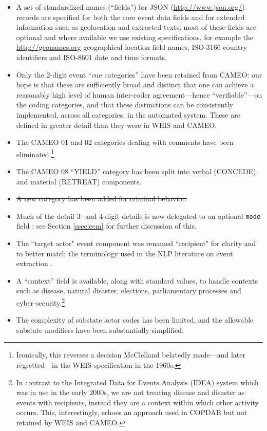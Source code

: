 \documentclass[11pt]{report}
\newcommand{\plcat}[1]{\textsf{#1}}
\newcommand{\fn}[1]{\footnote{#1}}
\begin{document}
\begin{itemize}
\item A set of standardized names (``fields'') for JSON (\url{http://www.json.org/}) records are specified for both the core event data fields and for extended information such as geolocation and extracted texts; most of these fields are optional and where available we use existing specifications, for example the \url{http://geonames.org} geographical location field names, ISO-3166 country identifiers and ISO-8601 date and time formats.
\item Only the 2-digit event ``cue categories'' have been retained from CAMEO: our hope is that these are sufficiently broad and distinct that one can achieve a reasonably high level of human inter-coder agreement---hence ``verifiable''---on the coding categories, and that these distinctions can be consistently implemented, across all categories, in the automated system. These are defined in greater detail than they were in WEIS and CAMEO.
\item The CAMEO 01 and 02 categories dealing with comments have been eliminated.\fn{Ironically, this reverses a decision McClelland belatedly made---and later regretted---in the WEIS specification in the 1960s.}
\item The CAMEO 08 ``YIELD'' category has been split into verbal (\plcat{CONCEDE}) and material (\plcat{RETREAT}) components. 
\item \sout{A new category has been added for criminal behavior.}
\item Much of the detail 3- and 4-digit details is now delegated to an optional \texttt{mode} field : see Section \ref{ssec:ecm} for further discussion of this.  
\item The ``target actor" event component was renamed ``recipient" for clarity and to better match the terminology used in the NLP literature on event extraction \citep{halterman2020extracting}.
\item A ``context'' field is available, along with standard values, to handle contexts such as disease, natural disaster, elections, parliamentary processes and cyber-security.\fn{In contrast to the Integrated Data for Events Analysis (IDEA) \cite{BBOJT03} system which was in use in the early 2000s, we are not treating disease and disaster as events with recipients, instead they are a context within which other activity occurs. This, interestingly, echoes an approach used in COPDAB but not retained by WEIS and CAMEO.}
\item The complexity of substate actor codes has been limited, and the allowable substate modifiers have been substantially simplified. 

\end{itemize}
\end{document}
